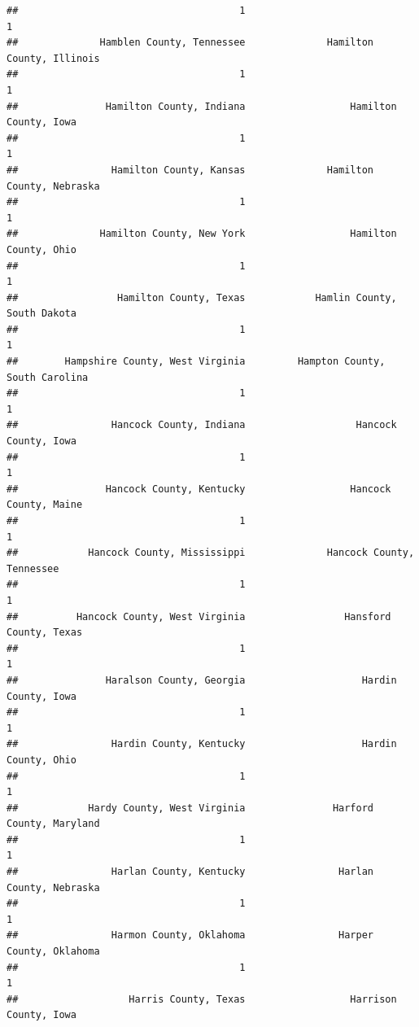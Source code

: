 \documentclass[
]{article}
\begin{document}
\begin{verbatim}
##                                      1                                      1 
##              Hamblen County, Tennessee              Hamilton County, Illinois 
##                                      1                                      1 
##               Hamilton County, Indiana                  Hamilton County, Iowa 
##                                      1                                      1 
##                Hamilton County, Kansas              Hamilton County, Nebraska 
##                                      1                                      1 
##              Hamilton County, New York                  Hamilton County, Ohio 
##                                      1                                      1 
##                 Hamilton County, Texas            Hamlin County, South Dakota 
##                                      1                                      1 
##        Hampshire County, West Virginia         Hampton County, South Carolina 
##                                      1                                      1 
##                Hancock County, Indiana                   Hancock County, Iowa 
##                                      1                                      1 
##               Hancock County, Kentucky                  Hancock County, Maine 
##                                      1                                      1 
##            Hancock County, Mississippi              Hancock County, Tennessee 
##                                      1                                      1 
##          Hancock County, West Virginia                 Hansford County, Texas 
##                                      1                                      1 
##               Haralson County, Georgia                    Hardin County, Iowa 
##                                      1                                      1 
##                Hardin County, Kentucky                    Hardin County, Ohio 
##                                      1                                      1 
##            Hardy County, West Virginia               Harford County, Maryland 
##                                      1                                      1 
##                Harlan County, Kentucky                Harlan County, Nebraska 
##                                      1                                      1 
##                Harmon County, Oklahoma                Harper County, Oklahoma 
##                                      1                                      1 
##                   Harris County, Texas                  Harrison County, Iowa 

\end{verbatim}
\end{document}
